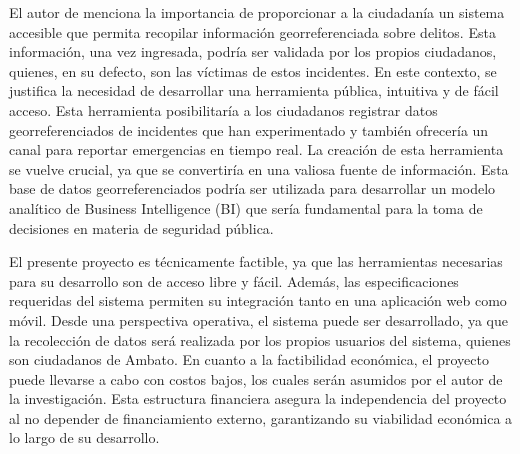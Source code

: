 El autor de \cite{naranjo-avalosImpactoGeorreferenciacionColaborativa2019} menciona la importancia de proporcionar a
la ciudadanía un sistema accesible que permita recopilar información georreferenciada sobre delitos. Esta información,
una vez ingresada, podría ser validada por los propios ciudadanos, quienes, en su defecto, son las víctimas de estos
incidentes. En este contexto, se justifica la necesidad de desarrollar una herramienta pública, intuitiva y de fácil acceso.
Esta herramienta posibilitaría a los ciudadanos registrar datos georreferenciados  de incidentes que han experimentado
y también ofrecería un canal para reportar emergencias en tiempo real. La creación de esta  herramienta se vuelve crucial,
ya que se convertiría en una valiosa fuente de información. Esta base de datos georreferenciados  podría ser utilizada
para desarrollar un modelo analítico de Business Intelligence (BI) que sería fundamental para la toma de  decisiones
en materia de seguridad pública.

\bigbreak
El presente proyecto es técnicamente factible, ya que las herramientas necesarias para su desarrollo son de acceso libre y
fácil. Además, las especificaciones requeridas del sistema permiten su integración tanto en una aplicación web como móvil.
Desde una perspectiva operativa, el sistema puede ser desarrollado, ya que la recolección de datos será realizada por los
propios usuarios del sistema, quienes son ciudadanos de Ambato.
En cuanto a la factibilidad económica, el proyecto puede llevarse a cabo con costos bajos, los cuales serán asumidos por
el autor de la investigación. Esta estructura financiera asegura la independencia del proyecto al no depender de financiamiento
externo, garantizando su viabilidad económica a lo largo de su desarrollo.